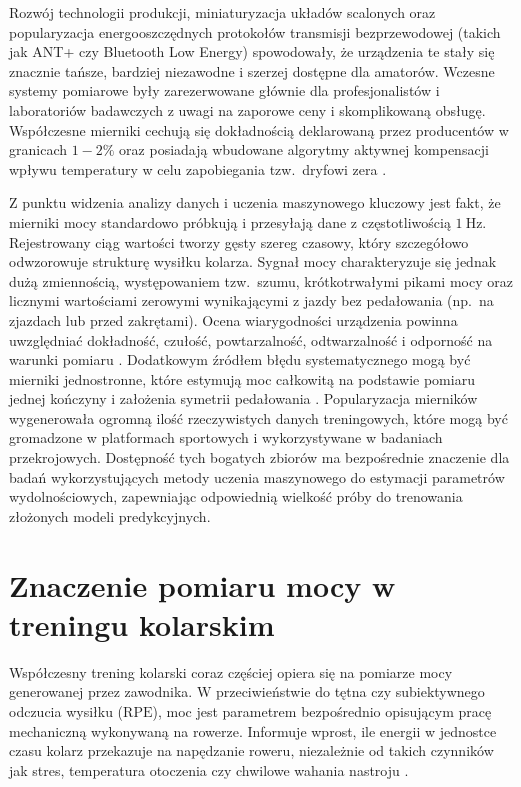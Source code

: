 Rozwój technologii produkcji, miniaturyzacja układów scalonych oraz popularyzacja energooszczędnych protokołów transmisji bezprzewodowej (takich jak ANT+ czy Bluetooth Low Energy) spowodowały, że urządzenia te stały się znacznie tańsze, bardziej niezawodne i szerzej dostępne dla amatorów. Wczesne systemy pomiarowe były zarezerwowane głównie dla profesjonalistów i laboratoriów badawczych z uwagi na zaporowe ceny i skomplikowaną obsługę. Współczesne mierniki cechują się dokładnością deklarowaną przez producentów w granicach $1-2\%$ oraz posiadają wbudowane algorytmy aktywnej kompensacji wpływu temperatury w celu zapobiegania tzw.\ dryfowi zera \parencite{bouillod2022powerMeters}.

Z punktu widzenia analizy danych i uczenia maszynowego kluczowy jest fakt, że mierniki mocy standardowo próbkują i przesyłają dane z częstotliwością $1\ \mathrm{Hz}$. Rejestrowany ciąg wartości tworzy gęsty szereg czasowy, który szczegółowo odwzorowuje strukturę wysiłku kolarza. Sygnał mocy charakteryzuje się jednak dużą zmiennością, występowaniem tzw.\ szumu, krótkotrwałymi pikami mocy oraz licznymi wartościami zerowymi wynikającymi z jazdy bez pedałowania (np.\ na zjazdach lub przed zakrętami). Ocena wiarygodności urządzenia powinna uwzględniać dokładność, czułość, powtarzalność, odtwarzalność i odporność na warunki pomiaru \parencite{bouillod2022powerMeters}. Dodatkowym źródłem błędu systematycznego mogą być mierniki jednostronne, które estymują moc całkowitą na podstawie pomiaru jednej kończyny i założenia symetrii pedałowania \parencite{valenzuela2022unilateral}. Popularyzacja mierników wygenerowała ogromną ilość rzeczywistych danych treningowych, które mogą być gromadzone w platformach sportowych i wykorzystywane w badaniach przekrojowych. Dostępność tych bogatych zbiorów ma bezpośrednie znaczenie dla badań wykorzystujących metody uczenia maszynowego do estymacji parametrów wydolnościowych, zapewniając odpowiednią wielkość próby do trenowania złożonych modeli predykcyjnych.

\section{Znaczenie pomiaru mocy w treningu kolarskim}

Współczesny trening kolarski coraz częściej opiera się na pomiarze mocy generowanej przez zawodnika.
W przeciwieństwie do tętna czy subiektywnego odczucia wysiłku ($\mathrm{RPE}$), moc jest parametrem bezpośrednio opisującym pracę mechaniczną wykonywaną na rowerze.
Informuje wprost, ile energii w jednostce czasu kolarz przekazuje na napędzanie roweru, niezależnie od takich czynników jak stres, temperatura otoczenia czy chwilowe wahania nastroju \parencite{allen2019power,phasescycling2023_ftp_variability}.

